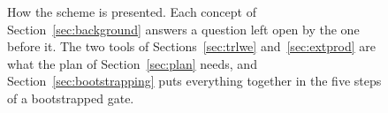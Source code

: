 \begin{figure}[!htb]
\centering

\caption{How the scheme is presented. Each concept of
Section~\ref{sec:background} answers a question left open by the one before
it. The two tools of Sections~\ref{sec:trlwe} and~\ref{sec:extprod} are what
the plan of Section~\ref{sec:plan} needs, and Section~\ref{sec:bootstrapping}
puts everything together in the five steps of a bootstrapped gate.}
\label{fig:roadmap}
\end{figure}
